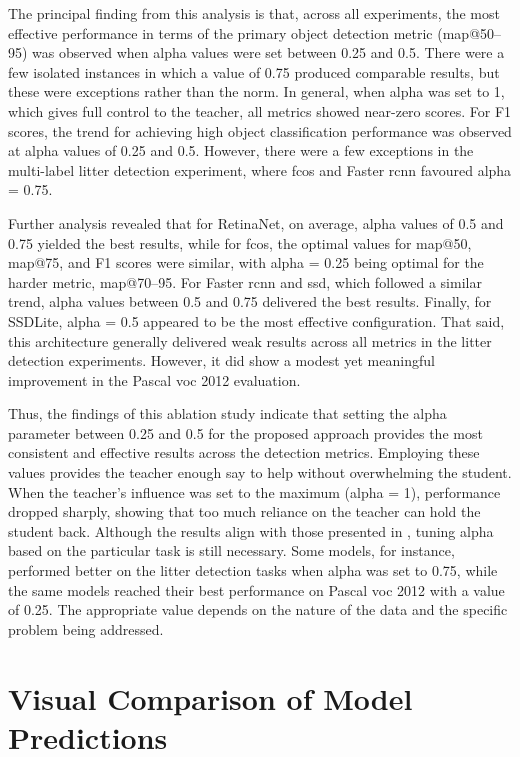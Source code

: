 The principal finding from this analysis is that, across all experiments, the most effective performance in terms of the primary object detection metric (\gls{map}@50–95) was observed when \gls{alpha} values were set between 0.25 and 0.5. There were a few isolated instances in which a value of 0.75 produced comparable results, but these were exceptions rather than the norm. In general, when \gls{alpha} was set to 1, which gives full control to the teacher, all metrics showed near-zero scores. For F1 scores, the trend for achieving high object classification performance was observed at \gls{alpha} values of 0.25 and 0.5. However, there were a few exceptions in the multi-label litter detection experiment, where \gls{fcos} and Faster \gls{rcnn} favoured \gls{alpha} = 0.75. 

Further analysis revealed that for RetinaNet, on average, \gls{alpha} values of 0.5 and 0.75 yielded the best results, while for \gls{fcos}, the optimal values for \gls{map}@50, \gls{map}@75, and F1 scores were similar, with \gls{alpha} = 0.25 being optimal for the harder metric, \gls{map}@70–95. For Faster \gls{rcnn} and \gls{ssd}, which followed a similar trend, \gls{alpha} values between 0.5 and 0.75 delivered the best results. Finally, for SSDLite, \gls{alpha} = 0.5 appeared to be the most effective configuration. That said, this architecture generally delivered weak results across all metrics in the litter detection experiments. However, it did show a modest yet meaningful improvement in the Pascal \gls{voc} 2012 evaluation.

Thus, the findings of this ablation study indicate that setting the \gls{alpha} parameter between 0.25 and 0.5 for the proposed approach provides the most consistent and effective results across the detection metrics. Employing these values provides the teacher enough say to help without overwhelming the student. When the teacher’s influence was set to the maximum (\gls{alpha} = 1), performance dropped sharply, showing that too much reliance on the teacher can hold the student back. Although the results align with those presented in \cite{lab2wild}, tuning \gls{alpha} based on the particular task is still necessary. Some models, for instance, performed better on the litter detection tasks when \gls{alpha} was set to 0.75, while the same models reached their best performance on Pascal \gls{voc} 2012 with a value of 0.25. The appropriate value depends on the nature of the data and the specific problem being addressed.


\section{Visual Comparison of Model Predictions}
\label{sec:5_visual_results}

